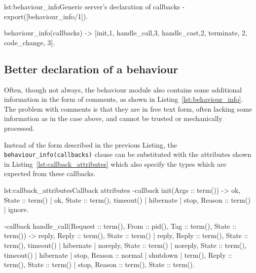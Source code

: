 \begin{console}{lst:behaviour_info}{Generic server's declaration of callbacks}
-export([behaviour_info/1]).

behaviour_info(callbacks) ->
  [{init,1}, {handle_call,3}, {handle_cast,2},
   {terminate, 2}, {code_change, 3}].


\end{console}

\subsection{Better declaration of a behaviour}

Often, though not always, the behaviour module also contains some
additional information in the form of comments, as shown in
Listing~\ref{lst:behaviour_info}. The problem with comments is that
they are in free text form, often lacking some information as in the
case above, and cannot be trusted or mechanically processed.

Instead of the form described in the previous Listing, the
\texttt{behaviour\_info(callbacks)} clause can be substituted with the
attributes shown in Listing~\ref{lst:callback_attributes} which also
specify the types which are expected from these callbacks.

\begin{console}{lst:callback_attributes}{Callback attributes}
-callback init(Args :: term()) ->
    {ok, State :: term()} |
    {ok, State :: term(), timeout() | hibernate} |
    {stop, Reason :: term()} | 
    ignore.

-callback handle_call(Request :: term(), From :: {pid(), Tag :: term()},
                      State :: term()) ->
    {reply, Reply :: term(), State :: term()} |
    {reply, Reply :: term(), State :: term(), timeout() | hibernate} |
    {noreply, State :: term()} |
    {noreply, State :: term(), timeout() | hibernate} |
    {stop, Reason :: normal | shutdown | term(), Reply :: term(), 
                                                 State :: term()} |
    {stop, Reason :: term(), State :: term()}.


\end{console}

